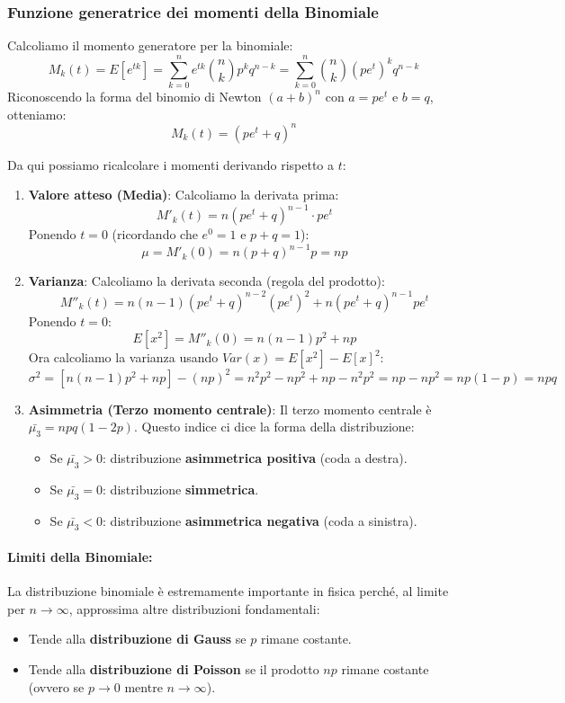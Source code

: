 \documentclass[openany,a4paper,12pt]{book}
\theoremstyle{remark}
\begin{document}
\subsubsection*{Funzione generatrice dei momenti della Binomiale}
Calcoliamo il momento generatore per la binomiale:
\[
M_k(t) = E[e^{tk}] = \sum_{k=0}^{n} e^{tk} \binom{n}{k} p^k q^{n-k} = \sum_{k=0}^{n} \binom{n}{k} (pe^t)^k q^{n-k}
\]
Riconoscendo la forma del binomio di Newton $(a+b)^n$ con $a=pe^t$ e $b=q$, otteniamo:
\[
M_k(t) = (pe^t + q)^n
\]

Da qui possiamo ricalcolare i momenti derivando rispetto a $t$:

\begin{enumerate}
    \item \textbf{Valore atteso (Media)}:
    Calcoliamo la derivata prima:
    \[ M'_k(t) = n(pe^t+q)^{n-1} \cdot pe^t \]
    Ponendo $t=0$ (ricordando che $e^0=1$ e $p+q=1$):
    \[ \mu = M'_k(0) = n(p+q)^{n-1}p = np \]

    \item \textbf{Varianza}:
    Calcoliamo la derivata seconda (regola del prodotto):
    \[ M''_k(t) = n(n-1)(pe^t+q)^{n-2}(pe^t)^2 + n(pe^t+q)^{n-1}pe^t \]
    Ponendo $t=0$:
    \[ E[x^2] = M''_k(0) = n(n-1)p^2 + np \]
    Ora calcoliamo la varianza usando $Var(x) = E[x^2] - E[x]^2$:
    \[
    \sigma^2 = [n(n-1)p^2 + np] - (np)^2 = n^2p^2 - np^2 + np - n^2p^2 = np - np^2 = np(1-p) = npq
    \]

    \item \textbf{Asimmetria (Terzo momento centrale)}:
    Il terzo momento centrale è $\bar{\mu_3} = npq(1-2p)$. Questo indice ci dice la forma della distribuzione:
    \begin{itemize}
        \item Se $\bar{\mu_3} > 0$: distribuzione \textbf{asimmetrica positiva} (coda a destra).
        \item Se $\bar{\mu_3} = 0$: distribuzione \textbf{simmetrica}.
        \item Se $\bar{\mu_3} < 0$: distribuzione \textbf{asimmetrica negativa} (coda a sinistra).
    \end{itemize}
\end{enumerate}

\vspace{0.5cm}

\paragraph{Limiti della Binomiale:}
La distribuzione binomiale è estremamente importante in fisica perché, al limite per $n \to \infty$, approssima altre distribuzioni fondamentali:
\begin{itemize}
    \item Tende alla \textbf{distribuzione di Gauss} se $p$ rimane costante.
    \item Tende alla \textbf{distribuzione di Poisson} se il prodotto $np$ rimane costante (ovvero se $p \to 0$ mentre $n \to \infty$).
\end{itemize}
\end{document}
